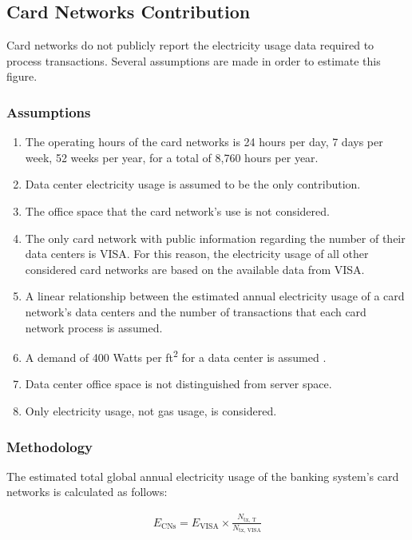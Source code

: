 \subsection{Card Networks Contribution}\label{section:banks-cn}
Card networks do not publicly report the electricity usage data required to process transactions.
Several assumptions are made in order to estimate this figure. 

\subsubsection{Assumptions}
\begin{enumerate}
  \item The operating hours of the card networks is 24 hours per day, 7 days per week, 52 weeks per year, for a total of 8,760 hours per year.
  \item Data center electricity usage is assumed to be the only contribution.
  \item The office space that the card network's use is not considered.
  \item The only card network with public information regarding the number of their data centers is VISA.
    For this reason, the electricity usage of all other considered card networks are based on the available data from VISA.
  \item A linear relationship between the estimated annual electricity usage of a card network's data centers and the number of transactions that each card network process is assumed.
  \item A demand of 400 Watts per ft\textsuperscript{2} for a data center is assumed \cite{dc-w-per-ft2}.
  \item Data center office space is not distinguished from server space.
  \item Only electricity usage, not gas usage, is considered.
\end{enumerate}

\subsubsection{Methodology}
The estimated total global annual electricity usage of the banking system's card networks is calculated as follows:

\begin{align}\label{eqn:banks-e-cns}
  E_\textrm{CNs} = E_\textrm{VISA} \times \frac{ N_\textrm{tx, T} }{ N_\textrm{tx, VISA} } 
\end{align}

